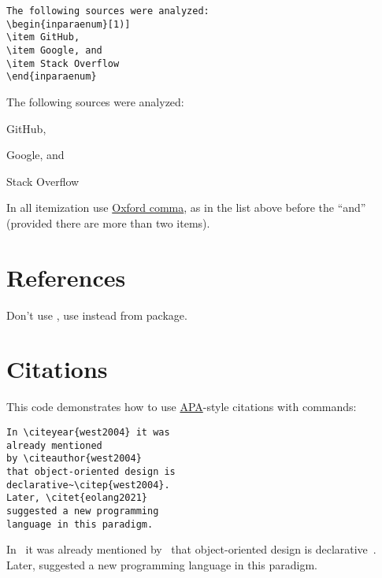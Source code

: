 \documentclass[12pt,nonacm,natbib=false]{acmart}
\begin{document}
\begin{multicols}{2}
\setlength{\parskip}{0pt}
\small
\raggedcolumns
\begin{verbatim}
The following sources were analyzed:
\begin{inparaenum}[1)]
\item GitHub,
\item Google, and
\item Stack Overflow
\end{inparaenum}
\end{verbatim}

\columnbreak

\raggedright
The following sources were
analyzed:
\begin{inparaenum}[1)]
\item GitHub,
\item Google, and
\item Stack Overflow
\end{inparaenum}
\end{multicols}

In all itemization use \href{https://en.wikipedia.org/wiki/Serial_comma}{Oxford comma}, as in the list above before the ``and'' (provided there are more than two items).

\section{References}

Don't use , use  instead from \href{https://ctan.org/pkg/cleveref}{} package.

\section{Citations}

This code demonstrates how to use \href{https://libguides.murdoch.edu.au/APA}{APA}-style citations with \href{https://journals.aas.org/natbib/}{} commands:

\begin{multicols}{2}
\setlength{\parskip}{0pt}
\small
\raggedcolumns
\begin{verbatim}
In \citeyear{west2004} it was
already mentioned
by \citeauthor{west2004}
that object-oriented design is
declarative~\citep{west2004}.
Later, \citet{eolang2021}
suggested a new programming
language in this paradigm.
\end{verbatim}

\columnbreak

\raggedright
In~\citeyear{west2004} it was already
mentioned by~\citeauthor{west2004} that
object-oriented design is
declarative~\citep{west2004}.
Later, \citet{eolang2021}
suggested a new programming
language in this paradigm.

\AtNextBibliography{\small}
\setlength\bibitemsep{3pt}
{\raggedright\printbibliography[heading=none]}
\end{multicols}
\end{document}
